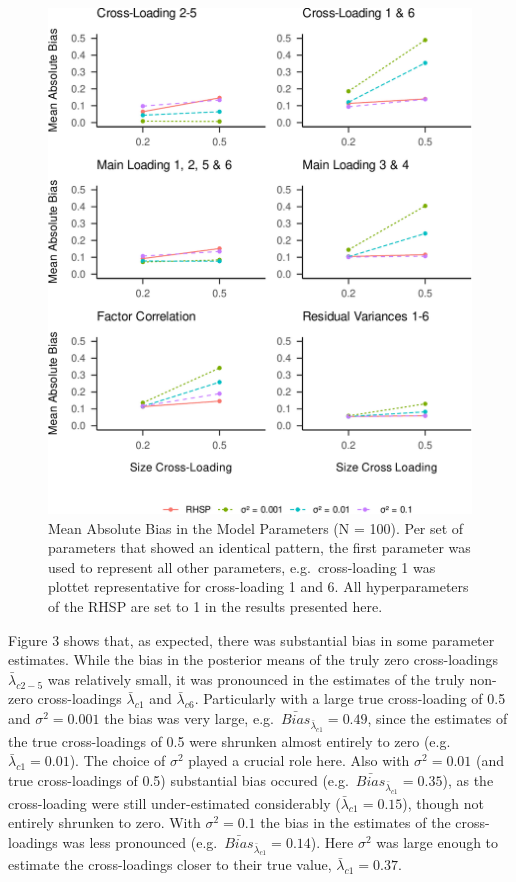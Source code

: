 \documentclass[
  man, donotrepeattitle,floatsintext]{apa6}
\begin{document}
\begin{figure}
\centering
\includegraphics{JMBKoch_thesis_files/figure-latex/unnamed-chunk-4-1.pdf}
\caption{\label{fig:unnamed-chunk-4}Mean Absolute Bias in the Model Parameters (N = 100). Per set of parameters that showed an identical pattern, the first parameter was used to represent all other parameters, e.g.~cross-loading 1 was plottet representative for cross-loading 1 and 6. All hyperparameters of the RHSP are set to 1 in the results presented here.}
\end{figure}

Figure 3 shows that, as expected, there was substantial bias in some parameter estimates. While the bias in the posterior means of the truly zero cross-loadings \(\bar{\lambda}_{c 2-5}\) was relatively small, it was pronounced in the estimates of the truly non-zero cross-loadings \(\bar{\lambda}_{c 1}\) and \(\bar{\lambda}_{c 6}\). Particularly with a large true cross-loading of 0.5 and \(\sigma^2 = 0.001\) the bias was very large, e.g.~\(\bar{Bias}_{\bar{\lambda}_{c 1}} = 0.49\), since the estimates of the true cross-loadings of 0.5 were shrunken almost entirely to zero (e.g.~\(\bar{\lambda}_{c 1} = 0.01\)). The choice of \(\sigma^2\) played a crucial role here. Also with \(\sigma^2 = 0.01\) (and true cross-loadings of 0.5) substantial bias occured (e.g.~\(\bar{Bias}_{\bar{\lambda}_{c 1}} = 0.35\)), as the cross-loading were still under-estimated considerably (\(\bar{\lambda}_{c 1} = 0.15\)), though not entirely shrunken to zero. With \(\sigma^2 = 0.1\) the bias in the estimates of the cross-loadings was less pronounced (e.g.~\(\bar{Bias}_{\bar{\lambda}_{c 1}} = 0.14\)). Here \(\sigma^2\) was large enough to estimate the cross-loadings closer to their true value, \(\bar{\lambda}_{c 1} = 0.37\).
\end{document}
